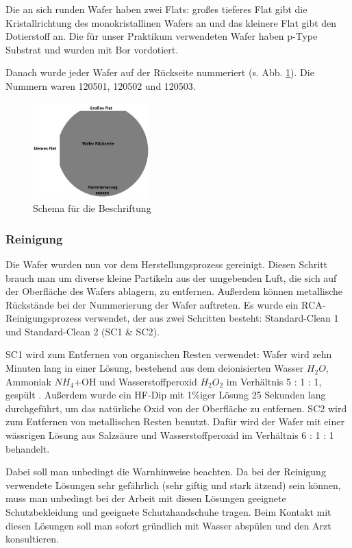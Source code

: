 Die an sich runden Wafer haben zwei Flats:  großes tieferes Flat gibt die Kristallrichtung des monokristallinen Wafers an und das kleinere Flat gibt den Dotierstoff an. Die für unser Praktikum verwendeten Wafer haben p-Type Substrat und wurden  mit Bor vordotiert.

Danach wurde jeder Wafer auf der Rückseite nummeriert (s. Abb. \ref{fig:WafRueckseite}). Die Nummern waren 120501, 120502 und 120503.

\begin{figure}[H]
    \centering
        \includegraphics[width=0.4\textwidth]{bilder/WafRueckseite.png}
    \caption{Schema für die Beschriftung}
    \label{fig:WafRueckseite}
\end{figure}


\subsubsection[Reinigung]{Reinigung}

Die Wafer wurden nun vor dem Herstellungsprozess gereinigt. Diesen Schritt brauch man um diverse kleine Partikeln aus der umgebenden Luft, die sich auf der Oberfläche des Wafers ablagern, zu entfernen. Außerdem können metallische Rückstände bei der Nummerierung der Wafer auftreten.
Es wurde ein RCA-Reinigungsprozess verwendet, der aus zwei Schritten besteht: Standard-Clean 1 und Standard-Clean 2 (SC1 \& SC2).

SC1 wird zum Entfernen von organischen Resten verwendet: Wafer wird zehn Minuten lang in einer Lösung,  bestehend aus dem deionisierten Wasser $H_{2}O$, Ammoniak $NH_4$+OH und Wasserstoffperoxid $ H_2O_2 $ im Verhältnis 5 : 1 : 1, gespült .
 Außerdem wurde ein HF-Dip mit 1\%iger Lösung 25 Sekunden lang durchgeführt, um das natürliche Oxid von der Oberfläche zu entfernen.
SC2 wird zum Entfernen von metallischen Resten benutzt. Dafür wird der Wafer mit einer wässrigen Lösung aus Salzsäure und Wasserstoffperoxid  im Verhältnis 6 : 1 : 1 behandelt.

Dabei  soll man unbedingt die Warnhinweise beachten. Da bei der Reinigung verwendete Lösungen sehr gefährlich (sehr giftig und stark ätzend) sein können, muss man unbedingt bei der Arbeit mit diesen Lösungen geeignete Schutzbekleidung und geeignete Schutzhandschuhe tragen. Beim Kontakt mit diesen Lösungen soll man sofort gründlich mit Wasser abspülen und den Arzt konsultieren.


